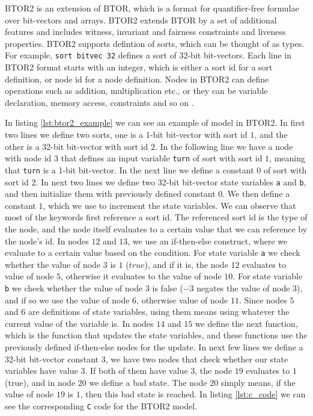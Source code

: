 \documentclass[12pt]{article}
\begin{document}
BTOR2 is an extension of BTOR, which is a format for quantifier-free formulae
over bit-vectors and arrays. BTOR2 extends BTOR by a set of additional features
and includes witness, invariant and fairness constraints and liveness
properties. BTOR2 supports defintion of sorts, which can be thought of as
types. For example, \texttt{sort bitvec 32} defines a sort of 32-bit
bit-vectors. Each line in BTOR2 format starts with an integer, which is either
a sort id for a sort definition, or node id for a node definition. Nodes in
BTOR2 can define operations such as addition, multiplication etc., or they can
be variable declaration, memory access, constraints and so on \cite{btor2}.

In listing \ref{lst:btor2_example} we can see an example of model in BTOR2. In
first two lines we define two sorts, one is a 1-bit bit-vector with sort id
$1$, and the other is a 32-bit bit-vector with sort id $2$. In the following line
we have a node with node id $3$ that defines an input variable \texttt{turn} of
sort with sort id $1$, meaning that \texttt{turn} is a 1-bit bit-vector. In the
next line we define a constant $0$ of sort with sort id $2$. In next two lines
we define two 32-bit bit-vector state variables \texttt{a} and \texttt{b}, and
then initialize them with previously defined constant $0$. We then define a
constant $1$, which we use to increment the state variables. We can observe
that most of the keywords first reference a sort id. The referenced sort id is
the type of the node, and the node itself evaluates to a certain value that we
can reference by the node's id. In nodes $12$ and $13$, we use an if-then-else
construct, where we evaluate to a certain value based on the condition. For
state variable \texttt{a} we check whether the value of node $3$ is $1$
($true$), and if it is, the node $12$ evaluates to value of node $5$, otherwise
it evaluates to the value of node $10$. For state variable \texttt{b} we check
whether the value of node $3$ is false ($-3$ negates the value of node $3$),
and if so we use the value of node $6$, otherwise value of node $11$. Since
nodes $5$ and $6$ are definitions of state variables, using them means using
whatever the current value of the variable is. In nodes $14$ and $15$ we define
the next function, which is the function that updates the state variables, and
these functions use the previously defined if-then-else nodes for the update.
In next few lines we define a 32-bit bit-vector constant $3$, we have two nodes
that check whether our state variables have value $3$. If both of them have
value $3$, the node $19$ evaluates to $1$ (true), and in node $20$ we define a
bad state. The node $20$ simply means, if the value of node $19$ is $1$, then
this bad state is reached. In listing \ref{lst:c_code} we can see the
corresponding \texttt{C} code for the BTOR2 model.
\end{document}
